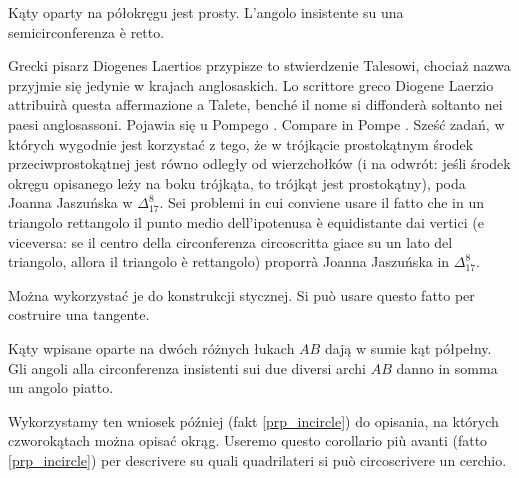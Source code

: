 \begin{corollary}
    Kąty oparty na półokręgu jest prosty. %
    L'angolo insistente su una semicirconferenza è retto. %
\end{corollary}

Grecki pisarz Diogenes Laertios przypisze to stwierdzenie Talesowi, chociaż nazwa przyjmie się jedynie w krajach anglosaskich. %
Lo scrittore greco Diogene Laerzio attribuirà questa affermazione a Talete, benché il nome si diffonderà soltanto nei paesi anglosassoni. %
Pojawia się u Pompego \cite[s. 37, 38]{pompe_2022}. %
Compare in Pompe \cite[pp. 37, 38]{pompe_2022}. %
Sześć zadań, w których wygodnie jest korzystać z tego, że w trójkącie prostokątnym środek przeciwprostokątnej jest równo odległy od wierzchołków (i na odwrót: jeśli środek okręgu opisanego leży na boku trójkąta, to trójkąt jest prostokątny), poda Joanna Jaszuńska w $\Delta_{17}^{8}$. %
Sei problemi in cui conviene usare il fatto che in un triangolo rettangolo il punto medio dell'ipotenusa è equidistante dai vertici (e viceversa: se il centro della circonferenza circoscritta giace su un lato del triangolo, allora il triangolo è rettangolo) proporrà Joanna Jaszuńska in $\Delta_{17}^{8}$. %

Można wykorzystać je do konstrukcji stycznej. %
Si può usare questo fatto per costruire una tangente. %

\begin{corollary}
    \label{ab_twice_pi}
    Kąty wpisane oparte na dwóch różnych łukach $AB$ dają w sumie kąt półpełny. %
    Gli angoli alla circonferenza insistenti sui due diversi archi $AB$ danno in somma un angolo piatto. %
\end{corollary}

Wykorzystamy ten wniosek później (fakt \ref{prp_incircle}) do opisania, na których czworokątach można opisać okrąg. %
Useremo questo corollario più avanti (fatto \ref{prp_incircle}) per descrivere su quali quadrilateri si può circoscrivere un cerchio. %

